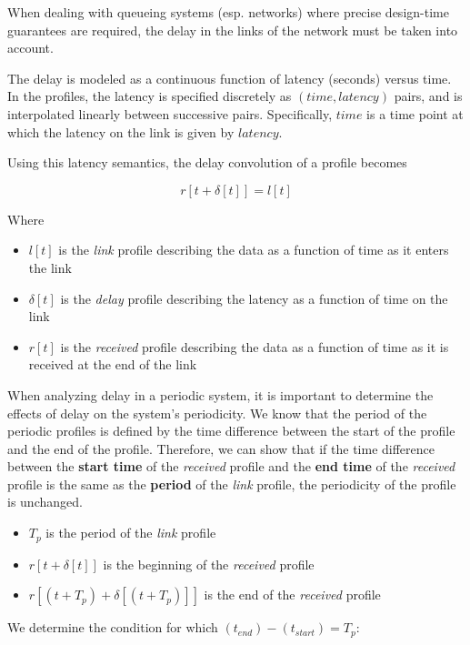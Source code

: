 When dealing with queueing systems (esp. networks) where precise
design-time guarantees are required, the delay in the links of the
network must be taken into account.

The delay is modeled as a continuous function of latency (seconds)
versus time.  In the profiles, the latency is specified discretely as
$(time, latency)$ pairs, and is interpolated linearly between
successive pairs.  Specifically, $time$ is a time point at which the
latency on the link is given by $latency$.  

Using this latency semantics, the delay convolution of a profile
becomes

\begin{equation}
  r[t + \delta[t]] = l[t]
\end{equation}

Where

\begin{itemize}
\item $l[t]$ is the \emph{link} profile describing the data as a
  function of time as it enters the link
\item $\delta[t]$ is the \emph{delay} profile describing the latency
  as a function of time on the link
\item $r[t]$ is the \emph{received} profile describing the data as a
  function of time as it is received at the end of the link
\end{itemize}
  
When analyzing delay in a periodic system, it is important to
determine the effects of delay on the system's periodicity.  We know
that the period of the periodic profiles is defined by the time
difference between the start of the profile and the end of the
profile.  Therefore, we can show that if the time difference between
the \textbf{start time} of the \emph{received} profile and the
\textbf{end time} of the \emph{received} profile is the same as the
\textbf{period} of the \emph{link} profile, the periodicity of the
profile is unchanged.

\begin{itemize}
\item $T_p$ is the period of the \emph{link} profile
\item $r[t + \delta[t]]$ is the beginning of the \emph{received}
  profile
\item $r[(t + T_p) + \delta[(t + T_p)]]$ is the end of the
  \emph{received} profile
\end{itemize}

We determine the condition for which $(t_{end}) - (t_{start}) =
T_p$:

